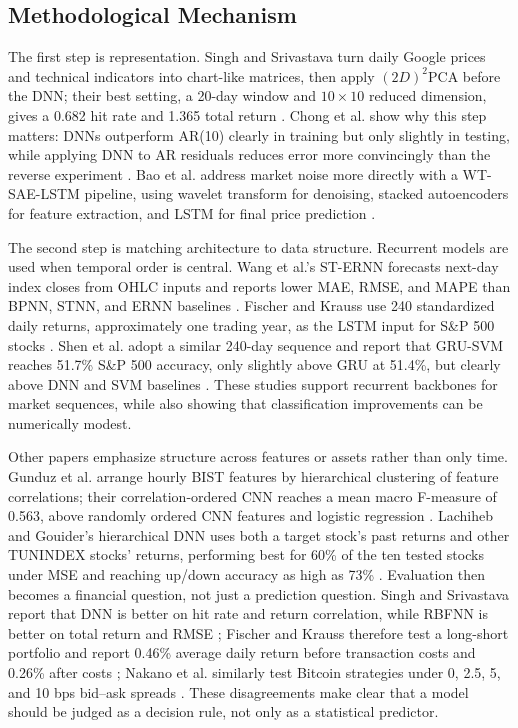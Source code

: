 \documentclass[conference]{IEEEtran}
\begin{document}
\subsection{Methodological Mechanism}
The first step is representation. Singh and Srivastava turn daily Google prices and technical indicators into chart-like matrices, then apply $(2D)^2$PCA before the DNN; their best setting, a 20-day window and $10 \times 10$ reduced dimension, gives a 0.682 hit rate and 1.365 total return \cite{singh2017stock}. Chong et al. show why this step matters: DNNs outperform AR(10) clearly in training but only slightly in testing, while applying DNN to AR residuals reduces error more convincingly than the reverse experiment \cite{chong2017deep}. Bao et al. address market noise more directly with a WT-SAE-LSTM pipeline, using wavelet transform for denoising, stacked autoencoders for feature extraction, and LSTM for final price prediction \cite{bao2017deep}.

The second step is matching architecture to data structure. Recurrent models are used when temporal order is central. Wang et al.'s ST-ERNN forecasts next-day index closes from OHLC inputs and reports lower MAE, RMSE, and MAPE than BPNN, STNN, and ERNN baselines \cite{wang2016elman}. Fischer and Krauss use 240 standardized daily returns, approximately one trading year, as the LSTM input for S\&P 500 stocks \cite{fischer2018deep}. Shen et al. adopt a similar 240-day sequence and report that GRU-SVM reaches 51.7\% S\&P 500 accuracy, only slightly above GRU at 51.4\%, but clearly above DNN and SVM baselines \cite{shen2018gru}. These studies support recurrent backbones for market sequences, while also showing that classification improvements can be numerically modest.

Other papers emphasize structure across features or assets rather than only time. Gunduz et al. arrange hourly BIST features by hierarchical clustering of feature correlations; their correlation-ordered CNN reaches a mean macro F-measure of 0.563, above randomly ordered CNN features and logistic regression \cite{gunduz2017intraday}. Lachiheb and Gouider's hierarchical DNN uses both a target stock's past returns and other TUNINDEX stocks' returns, performing best for 60\% of the ten tested stocks under MSE and reaching up/down accuracy as high as 73\% \cite{lachiheb2018hierarchical}. Evaluation then becomes a financial question, not just a prediction question. Singh and Srivastava report that DNN is better on hit rate and return correlation, while RBFNN is better on total return and RMSE \cite{singh2017stock}; Fischer and Krauss therefore test a long-short portfolio and report 0.46\% average daily return before transaction costs and 0.26\% after costs \cite{fischer2018deep}; Nakano et al. similarly test Bitcoin strategies under 0, 2.5, 5, and 10 bps bid--ask spreads \cite{nakano2018bitcoin}. These disagreements make clear that a model should be judged as a decision rule, not only as a statistical predictor.
\end{document}
